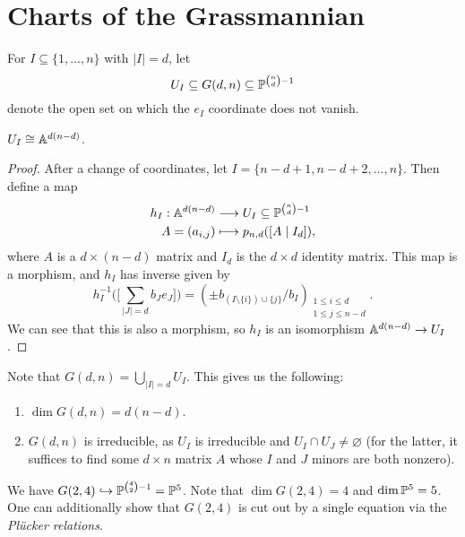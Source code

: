 \section{Charts of the Grassmannian}

\begin{remark}
  For $I \subseteq \{1, \dots, n\}$
  with $|I| = d$, let
  \[
    U_I \subseteq G(d, n) \subseteq \mathbb{P}^{\binom{n}{d} - 1}
  \]
  denote the open set on which the
  $e_I$ coordinate does not vanish.
\end{remark}

\begin{prop}
  $U_I \cong \mathbb{A}^{d(n - d)}$.
\end{prop}

\begin{proof}
  After a change of coordinates, let
  $I = \{n - d + 1, n - d + 2, \dots, n\}$.
  Then define a map
  \begin{align*}
    h_I : \mathbb{A}^{d(n - d)} &\longrightarrow U_I \subseteq \mathbb{P}^{\binom{n}{d} - 1} \\
    A = (a_{i, j}) &\longmapsto
    p_{n, d}([A \mid I_d]),
  \end{align*}
  where $A$ is a $d \times (n - d)$ matrix
  and $I_d$ is the $d \times d$ identity matrix.
  This map is a morphism, and $h_I$ has inverse
  given by
  \[
    h_I^{-1}
    \Big(
      \Big[\sum_{|J| = d} b_J e_J\Big]
    \Big)
    = (\pm b_{(I \setminus \{i\}) \cup \{j\}} / b_I)_{\substack{1 \le i \le d \\ 1 \le j \le n - d}}.
  \]
  We can see that this is also a morphism,
  so $h_I$ is an isomorphism
  $\mathbb{A}^{d(n - d)} \to U_I$.
\end{proof}

\begin{remark}
  Note that $G(d, n) = \bigcup_{|I| = d} U_I$.
  This gives us the following:
  \begin{enumerate}
    \item $\dim G(d, n) = d(n - d)$.
    \item $G(d, n)$ is irreducible,
      as $U_I$ is irreducible and
      $U_I \cap U_J \ne \varnothing$
      (for the latter, it suffices to find
      some $d \times n$ matrix $A$ whose
      $I$ and $J$ minors are both nonzero).
  \end{enumerate}
\end{remark}

\begin{example}
  We have
  $G(2, 4) \hookrightarrow \mathbb{P}^{\binom{4}{2} - 1} = \mathbb{P}^5$.
  Note that $\dim G(2, 4) = 4$ and
  $\dim \mathbb{P}^5 = 5$. One can additionally
  show that $G(2, 4)$ is cut out
  by a single equation via the
  \emph{Pl\"ucker relations}.
\end{example}

